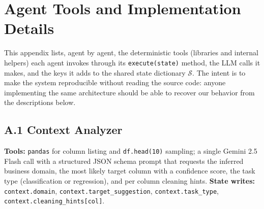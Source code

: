 \documentclass{article}
\begin{document}
\appendix

\section{Agent Tools and Implementation Details}
\label{app:agent-tools}

This appendix lists, agent by agent, the deterministic tools (libraries and
internal helpers) each agent invokes through its \texttt{execute(state)}
method, the LLM calls it makes, and the keys it adds to the shared state
dictionary $\mathcal{S}$. The intent is to make the system reproducible
without reading the source code: anyone implementing the same architecture
should be able to recover our behavior from the descriptions below.

\subsection*{A.1 Context Analyzer}
\textbf{Tools:} \texttt{pandas} for column listing and \texttt{df.head(10)}
sampling; a single Gemini 2.5 Flash call with a structured JSON schema
prompt that requests the inferred business domain, the most likely target
column with a confidence score, the task type (classification or regression),
and per column cleaning hints.
\textbf{State writes:} \texttt{context.domain}, \texttt{context.target\_suggestion},
\texttt{context.task\_type}, \texttt{context.cleaning\_hints[col]}.
\end{document}
